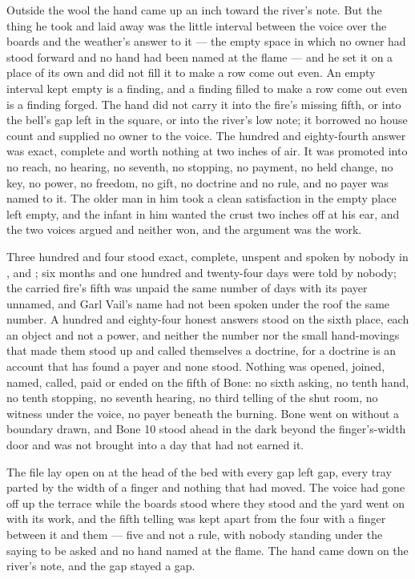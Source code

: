 Outside the wool the hand came up an inch toward the river's note. But the thing he took and laid away was the little interval between the voice over the boards and the weather's answer to it --- the empty space in which no owner had stood forward and no hand had been named at the flame --- and he set it on a place of its own and did not fill it to make a row come out even. An empty interval kept empty is a finding, and a finding filled to make a row come out even is a finding forged. The hand did not carry it into the fire's missing fifth, or into the bell's gap left in the square, or into the river's low note; it borrowed no house count and supplied no owner to the voice. The hundred and eighty-fourth answer was exact, complete and worth nothing at two inches of air. It was promoted into no reach, no hearing, no seventh, no stopping, no payment, no held change, no key, no power, no freedom, no gift, no doctrine and no rule, and no payer was named to it. The older man in him took a clean satisfaction in the empty place left empty, and the infant in him wanted the crust two inches off at his ear, and the two voices argued and neither won, and the argument was the work.

Three hundred and four stood exact, complete, unspent and spoken by nobody in ,  and ; six months and one hundred and twenty-four days were told by nobody; the carried fire's fifth was unpaid the same number of days with its payer unnamed, and Garl Vail's name had not been spoken under the roof the same number. A hundred and eighty-four honest answers stood on the sixth place, each an object and not a power, and neither the number nor the small hand-movings that made them stood up and called themselves a doctrine, for a doctrine is an account that has found a payer and none stood. Nothing was opened, joined, named, called, paid or ended on the fifth of Bone: no sixth asking, no tenth hand, no tenth stopping, no seventh hearing, no third telling of the shut room, no witness under the voice, no payer beneath the burning. Bone went on without a boundary drawn, and Bone 10 stood ahead in the dark beyond the finger's-width door and was not brought into a day that had not earned it.

The file lay open on  at the head of the bed with every gap left gap, every tray parted by the width of a finger and nothing that had moved. The voice had gone off up the terrace while the boards stood where they stood and the yard went on with its work, and the fifth telling was kept apart from the four with a finger between it and them --- five and not a rule, with nobody standing under the saying to be asked and no hand named at the flame. The hand came down on the river's note, and the gap stayed a gap.
